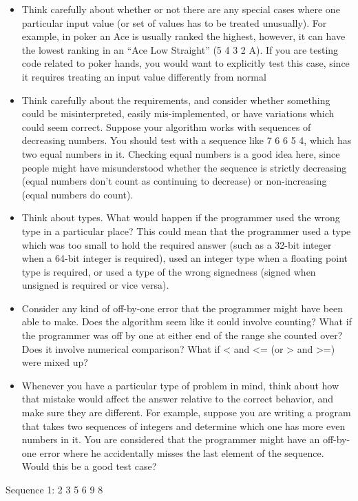 \documentclass[11pt, a4paper]{article}
\begin{document}
\begin{itemize}
  \item Think carefully about whether or not there are any special cases where one particular input value (or set of values has to be treated unusually). For example, in poker an Ace is usually ranked the highest, however, it can have the lowest ranking in an “Ace Low Straight” (5 4 3 2 A). If you are testing code related to poker hands, you would want to explicitly test this case, since it requires treating an input value differently from normal
  \item Think carefully about the requirements, and consider whether something could be misinterpreted, easily mis-implemented, or have variations which could seem correct. Suppose your algorithm works with sequences of decreasing numbers. You should test with a sequence like 7 6 6 5 4, which has two equal numbers in it. Checking equal numbers is a good idea here, since people might have misunderstood whether the sequence is strictly decreasing (equal numbers don’t count as continuing to decrease) or non-increasing (equal numbers do count).
  \item Think about types. What would happen if the programmer used the wrong type in a particular place? This could mean that the programmer used a type which was too small to hold the required answer (such as a 32-bit integer when a 64-bit integer is required), used an integer type when a floating point type is required, or used a type of the wrong signedness (signed when unsigned is required or vice versa).
  \item Consider any kind of off-by-one error that the programmer might have been able to make. Does the algorithm seem like it could involve counting? What if the programmer was off by one at either end of the range she counted over? Does it involve numerical comparison? What if < and <= (or > and >=) were mixed up?
  \item Whenever you have a particular type of problem in mind, think about how that mistake would affect the answer relative to the correct behavior, and make sure they are different. For example, suppose you are writing a program that takes two sequences of integers and determine which one has more even numbers in it. You are considered that the programmer might have an off-by-one error where he accidentally misses the last element of the sequence. Would this be a good test case?
\end{itemize}


Sequence 1: 2 3 5 6 9 8
\end{document}

